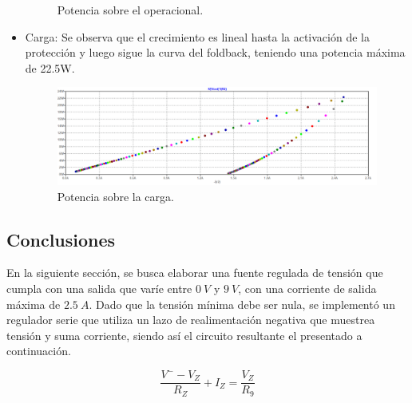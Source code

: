 \begin{itemize}
\begin{figure}[H]
	\caption{Potencia sobre el operacional.}
	\label{fig:potop}
\end{figure}
\item Carga: Se observa que el crecimiento es lineal hasta la activación de la protección y luego sigue la curva del foldback, teniendo una potencia máxima de 22.5W.
\begin{figure}[H]
\centering
	\includegraphics[width=1\textwidth]{ImagenesEjercicio2/potload.png}
	\caption{Potencia sobre la carga.}
	\label{fig:potload}
\end{figure}
\end{itemize}




\subsection{Conclusiones}











En la siguiente sección, se busca elaborar una fuente regulada de tensión que cumpla con una salida que varíe entre $0 \ V$ y $9 \ V$, con una corriente de salida máxima de $2.5 \ A$. Dado que la tensión mínima debe ser nula, se implementó un regulador serie que utiliza un lazo de realimentación negativa que muestrea tensión y suma corriente, siendo así el circuito resultante el presentado a continuación.
%

\begin{equation}
\frac{V^- - V_Z}{R_Z} + I_Z = \frac{V_Z}{R_9}
\end{equation}







